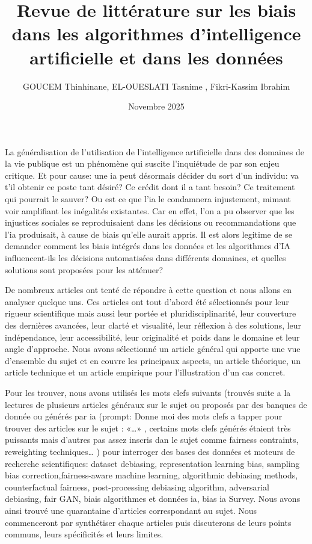 \documentclass{article}
\title{Revue de littérature sur les biais dans les algorithmes d’intelligence artificielle et dans les données
}
\author{GOUCEM Thinhinane, EL-OUESLATI Tasnime , Fikri-Kassim Ibrahim }
\date{Novembre 2025}
\begin{document}
\maketitle


La généralisation de l’utilisation de l’intelligence artificielle dans des domaines de la vie publique est un phénomène qui suscite l’inquiétude de par son enjeu critique. Et pour cause: une ia peut désormais décider du sort d’un individu: va t’il obtenir ce poste tant désiré? Ce crédit dont il a tant besoin? Ce traitement qui pourrait le sauver? Ou est ce que l’ia le condamnera injustement, mimant voir amplifiant les inégalités existantes. Car en effet, l’on a pu observer que les injustices sociales se reproduisaient dans les décisions ou recommandations que l’ia produisait, à cause de biais qu’elle aurait appris. Il est alors legitime de se demander comment les biais intégrés dans les données et les algorithmes d’IA influencent-ils les décisions automatisées dans différents domaines, et quelles solutions sont proposées pour les atténuer? 

De nombreux articles ont tenté de répondre à cette question et nous allons en analyser quelque uns. Ces articles ont tout d’abord été sélectionnés pour leur rigueur scientifique mais aussi leur portée et pluridisciplinarité, leur couverture des dernières avancées, leur clarté et visualité, leur réflexion à des solutions, leur indépendance, leur accessibilité, leur originalité et poids dans le domaine et leur angle d’approche. Nous avons sélectionné un article général\citep{ageneral2023} qui apporte une vue d’ensemble du sujet et en couvre les principaux aspects, un article théorique\citep{BarocasSelbst2016}, un article technique\citep{Mitchell1980} et un article empirique\citep{BuolamwiniG18} pour l’illustration d’un cas concret.

Pour les trouver, nous avons utilisés les mots clefs suivants (trouvés suite a la lectures de plusieurs articles généraux sur le sujet ou proposés par des banques de donnée ou générés par ia (prompt: Donne moi des mots clefs a tapper pour trouver des articles sur le sujet : «…» , certains mots clefs générés étaient très puissants mais d’autres pas assez inscris dan le sujet comme fairness contraints, reweighting techniques… ) pour interroger des bases des données et moteurs de recherche scientifiques: dataset debiasing, representation learning bias, sampling bias correction,fairness-aware machine learning, algorithmic debiasing methods, counterfactual fairness, post-processing debiasing algorithm, adversarial debiasing, fair GAN,  biais algorithmes et données ia, bias ia Survey. Nous avons ainsi trouvé une quarantaine d’articles correspondant au sujet.
Nous commenceront par synthétiser chaque articles puis discuterons de leurs points communs,  leurs spécificités et leurs limites.
\end{document}
